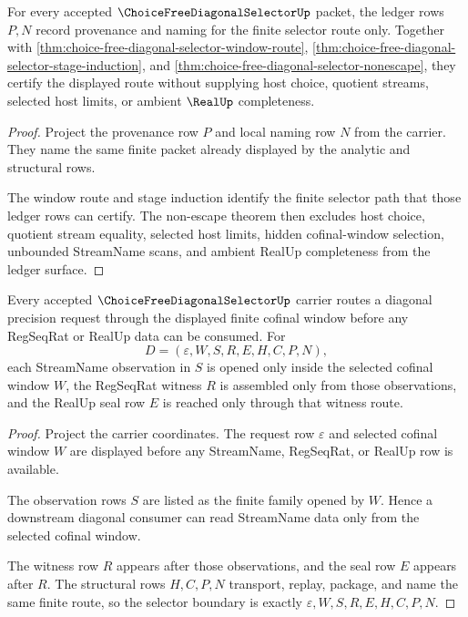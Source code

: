 \begin{theorem}
\label{thm:choice-free-diagonal-selector-obligation-ledger}
For every accepted $\ChoiceFreeDiagonalSelectorUp$ packet, the ledger rows $P,N$ record provenance and naming for the finite selector route only. Together with \autoref{thm:choice-free-diagonal-selector-window-route}, \autoref{thm:choice-free-diagonal-selector-stage-induction}, and \autoref{thm:choice-free-diagonal-selector-nonescape}, they certify the displayed route without supplying host choice, quotient streams, selected host limits, or ambient $\RealUp$ completeness.
\end{theorem}
\begin{proof}
Project the provenance row $P$ and local naming row $N$ from the carrier. They name the same finite packet already displayed by the analytic and structural rows.

The window route and stage induction identify the finite selector path that those ledger rows can certify. The non-escape theorem then excludes host choice, quotient stream equality, selected host limits, hidden cofinal-window selection, unbounded StreamName scans, and ambient RealUp completeness from the ledger surface.
\end{proof}

\begin{theorem}
\label{thm:choice-free-diagonal-selector-window-route}
Every accepted $\ChoiceFreeDiagonalSelectorUp$ carrier routes a diagonal precision request through the displayed finite cofinal window before any RegSeqRat or RealUp data can be consumed. For
$$
D=(\varepsilon,W,S,R,E,H,C,P,N),
$$
each StreamName observation in $S$ is opened only inside the selected cofinal window $W$, the RegSeqRat witness $R$ is assembled only from those observations, and the RealUp seal row $E$ is reached only through that witness route.
\end{theorem}
\begin{proof}
Project the carrier coordinates. The request row $\varepsilon$ and selected cofinal window $W$ are displayed before any StreamName, RegSeqRat, or RealUp row is available.

The observation rows $S$ are listed as the finite family opened by $W$. Hence a downstream diagonal consumer can read StreamName data only from the selected cofinal window.

The witness row $R$ appears after those observations, and the seal row $E$ appears after $R$. The structural rows $H,C,P,N$ transport, replay, package, and name the same finite route, so the selector boundary is exactly $\varepsilon,W,S,R,E,H,C,P,N$.
\end{proof}

